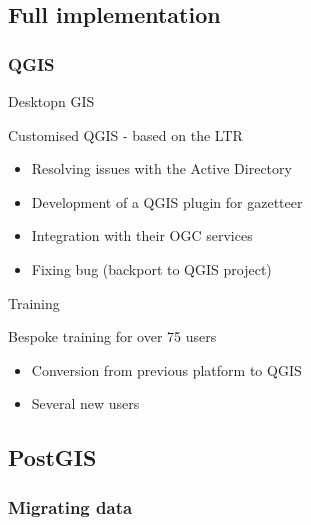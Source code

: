 \subsection{Full implementation}
\subsubsection{QGIS}
\begin{frame}{Desktopn GIS}
	\begin{block}{Customised QGIS - based on the LTR}
		\begin{itemize}
			\item Resolving issues with the Active Directory
			\item Development of a QGIS plugin for gazetteer
			\item Integration with their OGC services
			\item Fixing bug (backport to QGIS project)
		\end{itemize}
	\end{block}
\end{frame}

\begin{frame}{Training}
	\begin{block}{Bespoke training for over 75 users}
		\begin{itemize}
			\item Conversion from previous platform to QGIS
			\item Several new users
		\end{itemize}
	\end{block}
\end{frame}

\subsection{PostGIS}

\subsubsection{Migrating data}

